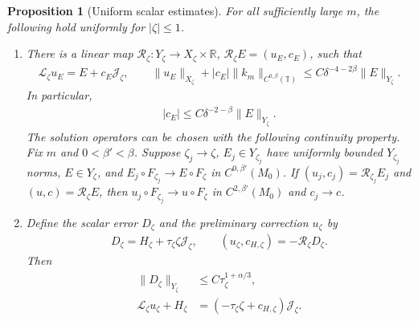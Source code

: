 \documentclass[a4paper,11pt,oneside,reqno]{amsart}
\numberwithin{equation}{section}
\newtheorem{proposition}[theorem]{Proposition}
\theoremstyle{definition}
\begin{document}
\begin{proposition}[Uniform scalar estimates]
    \label{prop:s4-scalar-input}
    For all sufficiently large $m$, the following hold uniformly
    for $|\zeta|\leq1$.

    \begin{enumerate}
        \item There is a linear map
            $\mathscr{R}_\zeta:Y_\zeta\to X_\zeta\times\mathbb{R}$,
            $\mathscr{R}_\zeta E=(u_E,c_E)$, such that
            \begin{align}
                \label{eq:s4-scalar-inverse}
                \mathcal{L}_\zeta u_E=E+c_E\mathcal{J}_\zeta,
                \qquad
                \|u_E\|_{X_\zeta}+|c_E|\|k_m\|_{C^{0,\beta}(\mathbb{T})}
                \leq C\delta^{-4-2\beta}\|E\|_{Y_\zeta}.
            \end{align}
            In particular,
            \begin{align}
                \label{eq:s4-coefficient-bound}
                |c_E|\leq C\delta^{-2-\beta}\|E\|_{Y_\zeta}.
            \end{align}
            The solution operators can be chosen with the following continuity
            property. Fix $m$ and $0<\beta'<\beta$. Suppose
            $\zeta_j\to\zeta$, $E_j\in Y_{\zeta_j}$ have uniformly
            bounded $Y_{\zeta_j}$ norms, $E\in Y_\zeta$, and
            $E_j\circ F_{\zeta_j}\to E\circ F_\zeta$ in
            $C^{0,\beta'}(M_0)$. If
            $(u_j,c_j)=\mathscr{R}_{\zeta_j}E_j$ and
            $(u,c)=\mathscr{R}_\zeta E$, then
            $u_j\circ F_{\zeta_j}\to u\circ F_\zeta$ in
            $C^{2,\beta'}(M_0)$ and $c_j\to c$.

        \item Define the scalar error $D_\zeta$ and the preliminary
            correction $u_\zeta$ by
            \begin{align}
                \label{eq:s4-initial-correction}
                D_\zeta=H_\zeta+\tau_\zeta\zeta\mathcal{J}_\zeta,
                \qquad
                (u_\zeta,c_{H,\zeta})=-\mathscr{R}_\zeta D_\zeta.
            \end{align}
            Then
            \begin{align}
                \|D_\zeta\|_{Y_\zeta}&\leq C\tau_\zeta^{1+\alpha/3},
                \label{eq:s4-H-error}\\
                \mathcal{L}_\zeta u_\zeta+H_\zeta
                &=(-\tau_\zeta\zeta+c_{H,\zeta})\mathcal{J}_\zeta.
                \label{eq:s4-linear-cancellation}
            \end{align}


\end{enumerate}
\end{proposition}
\end{document}
